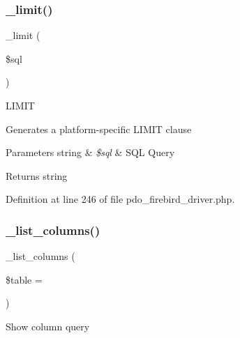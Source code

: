\mbox{\label{class_c_i___d_b__pdo__firebird__driver_a3a02ea06541b8ecc25a33a61651562c8}} 
\subsubsection{\texorpdfstring{\_limit()}{\_limit()}}
{\footnotesize\ttfamily \+\_\+limit (\begin{DoxyParamCaption}\item[{}]{\$sql }\end{DoxyParamCaption})\hspace{0.3cm}{\ttfamily [protected]}}

L\+I\+M\+IT

Generates a platform-\/specific L\+I\+M\+IT clause


\begin{DoxyParams}[1]{Parameters}
string & {\em \$sql} & S\+QL Query \\
\hline
\end{DoxyParams}
\begin{DoxyReturn}{Returns}
string 
\end{DoxyReturn}


Definition at line 246 of file pdo\+\_\+firebird\+\_\+driver.\+php.

\mbox{\label{class_c_i___d_b__pdo__firebird__driver_a7ccb7f9c301fe7f0a9db701254142b63}} 
\subsubsection{\texorpdfstring{\_list\_columns()}{\_list\_columns()}}
{\footnotesize\ttfamily \+\_\+list\+\_\+columns (\begin{DoxyParamCaption}\item[{}]{\$table = {\ttfamily \textquotesingle{}\textquotesingle{}} }\end{DoxyParamCaption})\hspace{0.3cm}{\ttfamily [protected]}}

Show column query


